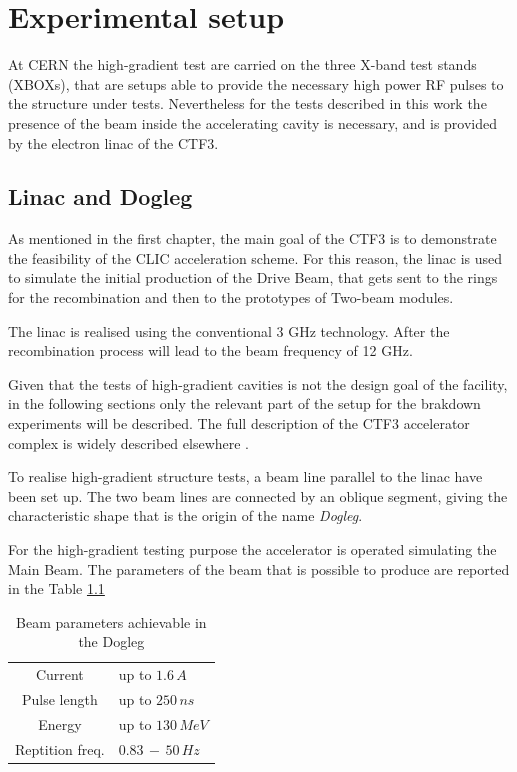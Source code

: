 \chapter[Experimental setup]{Experimental setup}

At CERN the high-gradient test are carried on the three X-band test stands (XBOXs), that are setups able to provide the necessary high power RF pulses to the structure under tests. Nevertheless for the tests described in this work the presence of the beam inside the accelerating cavity is necessary, and is provided by the electron linac of the CTF3. 


\section[Linac and dogleg]{Linac and Dogleg}

As mentioned in the first chapter, the main goal of the CTF3 is to demonstrate the feasibility of the CLIC acceleration scheme. For this reason, the linac is used to simulate the initial production of the Drive Beam, that gets sent to the rings for the recombination and then to the prototypes of Two-beam modules. 

The linac is realised using the conventional 3 GHz technology. After the recombination process will lead to the beam frequency of 12 GHz. 

Given that the tests of high-gradient cavities is not the design goal of the facility, in the following sections only the relevant part of the setup for the brakdown experiments will be described. The full description of the CTF3 accelerator complex is widely described elsewhere \cite{CLIC:cdr,CTF:drive_beam,ctf3:dr}. 

To realise high-gradient structure tests, a beam line parallel to the linac have been set up. The two beam lines are connected by an oblique segment, giving the characteristic shape that is the origin of the name \textit{Dogleg}.

For the high-gradient testing purpose the accelerator is operated simulating the Main Beam. The parameters of the beam that is possible to produce are reported in the Table \ref{beam_par_dogleg}


\begin{table}
  \centering
    \begin{tabular}{ c l }
    \hline
    \hline
    Current 		&	up to $1.6\,A$\\
    Pulse length		&	up to $250\,ns$\\
    Energy			&	up to $130\, MeV$\\
    Reptition freq.	&	$0.83\,-\,50\, Hz$\\
    \hline
    \hline
    \end{tabular}
\caption{Beam parameters achievable in the Dogleg \cite{NavarroQuirante:2025954}}
\label{beam_par_dogleg}
\end{table}



